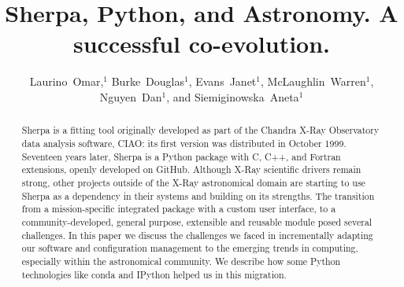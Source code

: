 \documentclass[11pt,twoside]{article}
\begin{document}
\title{Sherpa, Python, and Astronomy. A successful co-evolution.}

\author{Laurino~Omar,$^1$ Burke~Douglas$^1$, Evans~Janet$^1$, McLaughlin~Warren$^1$,
Nguyen~Dan$^1$, and Siemiginowska~Aneta$^1$
}



\begin{abstract}
Sherpa is a fitting tool originally developed as part of the Chandra X-Ray 
Observatory data analysis software, CIAO: its first version was distributed 
in October 1999. Seventeen years later, Sherpa is a Python package with C, C++, and Fortran 
extensions, openly developed on GitHub. Although X-Ray scientific drivers 
remain strong, other projects outside of the X-Ray astronomical domain are 
starting to use Sherpa as a dependency in their systems and building on its 
strengths. The transition from a mission-specific integrated package with a custom 
user interface, to a community-developed, general purpose, extensible and 
reusable module posed several challenges.
In this paper we discuss the challenges we faced in incrementally 
adapting our software and configuration management to the emerging trends 
in computing, especially within the astronomical community. We describe how 
some Python technologies like conda and IPython helped us in this 
migration. 
\end{abstract}
\end{document}
